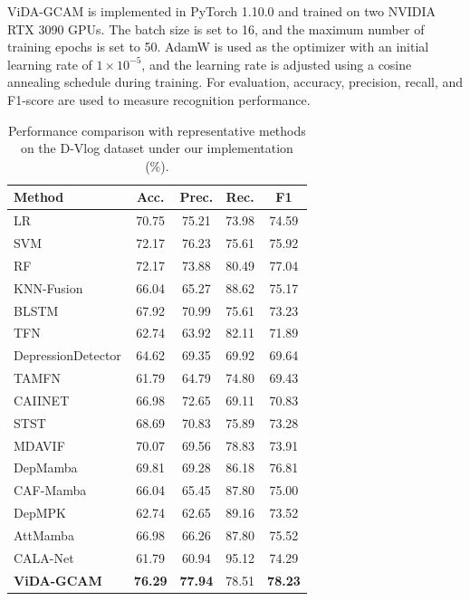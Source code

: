 \documentclass[a4paper,fleqn]{cas-dc}
\begin{document}
ViDA-GCAM is implemented in PyTorch 1.10.0 and trained on two NVIDIA RTX 3090 GPUs. The batch size is set to 16, and the maximum number of training epochs is set to 50. AdamW is used as the optimizer with an initial learning rate of $1\times10^{-5}$, and the learning rate is adjusted using a cosine annealing schedule during training. For evaluation, accuracy, precision, recall, and F1-score are used to measure recognition performance. 


\begin{table}[htbp]
\centering
\caption{Performance comparison with representative methods on the D-Vlog dataset under our implementation (\%).}
\label{tab:main_results}
\begin{tabular}{lcccc}
\hline
Method & Acc. & Prec. & Rec. & F1 \\
\hline
LR & 70.75 & 75.21 & 73.98 & 74.59 \\
SVM & 72.17 & 76.23 & 75.61 & 75.92 \\
RF & 72.17 & 73.88 & 80.49 & 77.04 \\
KNN-Fusion & 66.04 & 65.27 & 88.62 & 75.17 \\
BLSTM & 67.92 & 70.99 & 75.61 & 73.23 \\
TFN\cite{model:TFN} & 62.74 & 63.92 & 82.11 & 71.89 \\
DepressionDetector\cite{dataset:dvlog} & 64.62 & 69.35 & 69.92 & 69.64 \\
TAMFN\cite{model:TAMFN} & 61.79 & 64.79 & 74.80 & 69.43 \\
CAIINET\cite{model:CAIINET} & 66.98 & 72.65 & 69.11 & 70.83 \\
STST\cite{model:STST} & 68.69 & 70.83 & 75.89 & 73.28 \\
MDAVIF\cite{model:MDAVIF} & 70.07 & 69.56 & 78.83 & 73.91 \\
DepMamba\cite{model:DepMamba} & 69.81 & 69.28 & 86.18 & 76.81 \\
CAF-Mamba\cite{model:CAFMamba} & 66.04 & 65.45 & 87.80 & 75.00 \\
DepMPK\cite{model:DepMPK} & 62.74 & 62.65 & 89.16 & 73.52 \\
AttMamba\cite{model:AttMamba} & 66.98 & 66.26 & 87.80 & 75.52 \\
CALA-Net\cite{model:CALA-Net} & 61.79 & 60.94 & 95.12 & 74.29 \\
\hline
\textbf{ViDA-GCAM} & \textbf{76.29} & \textbf{77.94} & 78.51 & \textbf{78.23} \\
\hline
\end{tabular}
\end{table}
\end{document}
